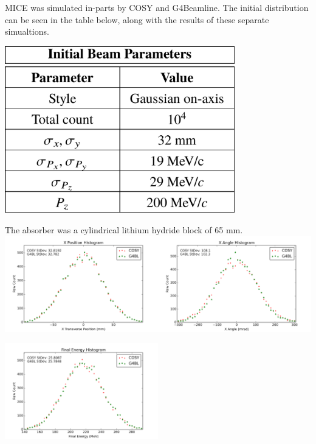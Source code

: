 \documentclass[portrait,a0paper,fontscale=0.285]{baposter} %
\begin{document}
\begin{poster}
{
MICE was simulated in-parts by COSY and G4Beamline. The initial distribution can be seen in the table below, along with the results of these separate simualtions.
\begin{center} \includegraphics[width=0.75\textwidth]{Figures/initial_distribution_table} \end{center}
The absorber was a cylindrical lithium hydride block of 65 mm.\\
\includegraphics[width=0.5\textwidth]{Figures/wedge tests (LiH)/xposition}\includegraphics[width=0.5\textwidth]{Figures/wedge tests (LiH)/xangle}
\begin{center} \includegraphics[width=0.5\textwidth]{Figures/wedge tests (LiH)/energy} \end{center}
}
\end{poster}
\end{document}
